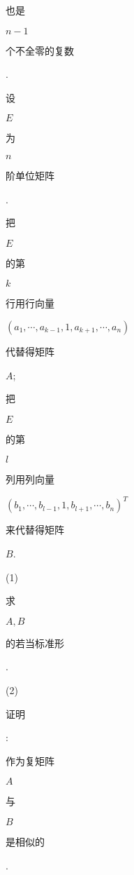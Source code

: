 \documentclass[10pt]{article}
\begin{document}
\begin{CJK}{UTF8}{mj}也是\end{CJK} $n-1$ \begin{CJK}{UTF8}{mj}个不全零的复数\end{CJK}. \begin{CJK}{UTF8}{mj}设\end{CJK} $E$ \begin{CJK}{UTF8}{mj}为\end{CJK} $n$ \begin{CJK}{UTF8}{mj}阶单位矩阵\end{CJK}.\begin{CJK}{UTF8}{mj}把\end{CJK} $E$ \begin{CJK}{UTF8}{mj}的第\end{CJK} $k$ \begin{CJK}{UTF8}{mj}行用行向量\end{CJK} $\left(a_{1}, \cdots, a_{k-1}, 1, a_{k+1}, \cdots, a_{n}\right)$ \begin{CJK}{UTF8}{mj}代替得矩阵\end{CJK} $A$; \begin{CJK}{UTF8}{mj}把\end{CJK} $E$ \begin{CJK}{UTF8}{mj}的第\end{CJK} $l$ \begin{CJK}{UTF8}{mj}列用列向量\end{CJK} $\left(b_{1}, \cdots, b_{l-1}, 1, b_{l+1}, \cdots, b_{n}\right)^{T}$ \begin{CJK}{UTF8}{mj}来代替得矩阵\end{CJK} $B$.

(1) \begin{CJK}{UTF8}{mj}求\end{CJK} $A, B$ \begin{CJK}{UTF8}{mj}的若当标准形\end{CJK}.

(2) \begin{CJK}{UTF8}{mj}证明\end{CJK}: \begin{CJK}{UTF8}{mj}作为复矩阵\end{CJK} $A$ \begin{CJK}{UTF8}{mj}与\end{CJK} $B$ \begin{CJK}{UTF8}{mj}是相似的\end{CJK}.
\end{document}
